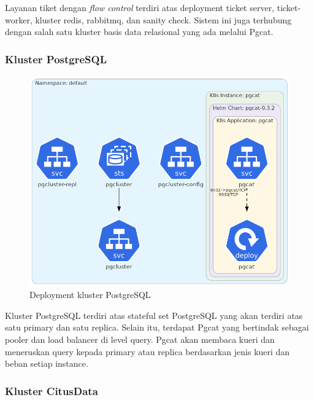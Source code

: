 Layanan tiket dengan \textit{flow control} terdiri atas deployment ticket server, ticket-worker, kluster redis, rabbitmq, dan sanity check. Sistem ini juga terhubung dengan salah satu kluster basis data relasional yang ada melalui Pgcat.

\pagebreak

\subsubsection{Kluster PostgreSQL}

\begin{figure}[htbp]
    \centering
    \includegraphics[width=1\textwidth]{resources/chapter-4/postgres.png}
    \caption{Deployment kluster PostgreSQL}
    \label{fig:deployment-postgres}
\end{figure}

Kluster PostgreSQL terdiri atas stateful set PostgreSQL yang akan terdiri atas satu primary dan satu replica. Selain itu, terdapat Pgcat yang bertindak sebagai pooler dan load balancer di level query. Pgcat akan membaca kueri dan meneruskan query kepada primary atau replica berdasarkan jenis kueri dan beban setiap instance.

\pagebreak

\subsubsection{Kluster CitusData}

